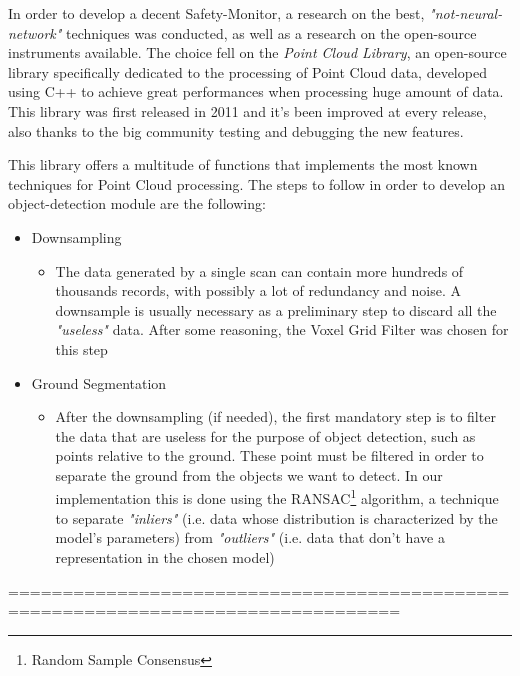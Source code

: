 In order to develop a decent Safety-Monitor, a research on the best, \textsl{"not-neural-network"} techniques was conducted, as well as a research on the open-source instruments available. The choice fell on the \textsl{Point Cloud Library}\cite{pcl}, an open-source library specifically dedicated to the processing of Point Cloud data, developed using C++ to achieve great performances when processing huge amount of data.
This library was first released in 2011\cite{pclwiki} and it's been improved at every release, also thanks to the big community testing and debugging the new features.

This library offers a multitude of functions that implements the most known techniques for Point Cloud processing. The steps to follow in order to develop an object-detection module are the following:

\begin{itemize}
	\item[1)] Downsampling
	\begin{itemize}
		\item[$\rightarrow$] The data generated by a single scan can contain more hundreds of thousands records, with possibly a lot of redundancy and noise. A downsample is usually necessary as a preliminary step to discard all the \textsl{"useless"} data. After some reasoning, the Voxel Grid Filter was chosen for this step
	\end{itemize}
\end{itemize}

\begin{itemize}
	\item[2)] Ground Segmentation
	\begin{itemize}
		\item[$\rightarrow$] After the downsampling (if needed), the first mandatory step is to filter the data that are useless for the purpose of object detection, such as points relative to the ground. These point must be filtered in order to separate the ground from the objects we want to detect.
		In our implementation this is done using the RANSAC\footnote{Random Sample Consensus} algorithm\cite{ransac}, a technique to separate \textsl{"inliers"} (i.e. data whose distribution is characterized by the model's parameters) from \textsl{"outliers"} (i.e. data that don't have a representation in the chosen model)
	\end{itemize}
\end{itemize}

==================================================================================

